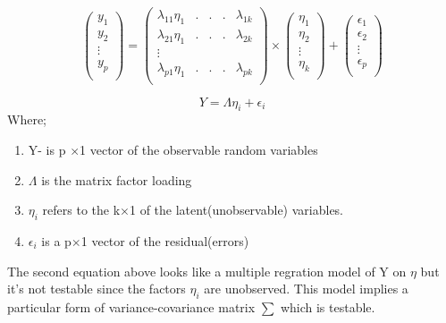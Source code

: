 \documentclass[12pt]{article}
\begin{document}
	\begin{equation*}
	\left(
	\begin{matrix}
		y_1\\
		y_2\\
		\vdots \\
		y_p\\
	\end{matrix}
	\right) = 
	\left(\begin{matrix}
		\lambda_{11}\eta_1 & .&.&.& \lambda_{1k}\\
		\lambda_{21}\eta_1 &  .&.&. & \lambda_{2k}\\
		\vdots\\
		\lambda_{p1}\eta_1  & .&.&. &\lambda_{pk}\\
	\end{matrix}\right) \times
	\left(\begin{matrix}
		\eta_1\\
		\eta_2\\
		\vdots\\
		\eta_k\\
	\end{matrix}\right)+ \left(\begin{matrix}
		\epsilon_1\\
		\epsilon_2\\
		\vdots\\
		\epsilon_p\\
	\end{matrix}\right)
\end{equation*}

\begin{equation*}
	Y=\Lambda\eta_i + \epsilon_i
\end{equation*}
Where;
\begin{enumerate}

\item Y- is p $\times$1 vector of the observable random variables
\item $\Lambda$ is the matrix factor loading
\item $\eta_i$ refers to the k$\times$1 of the latent(unobservable) variables.
\item $\epsilon_i$ is a p$\times$1 vector of the residual(errors)
\end{enumerate}

The second equation above looks like a multiple regration model of Y on $\eta$ but it's not testable since the factors $\eta_i$ are unobserved. This model implies a particular form of variance-covariance matrix $\sum$ which is testable.
\end{document}
